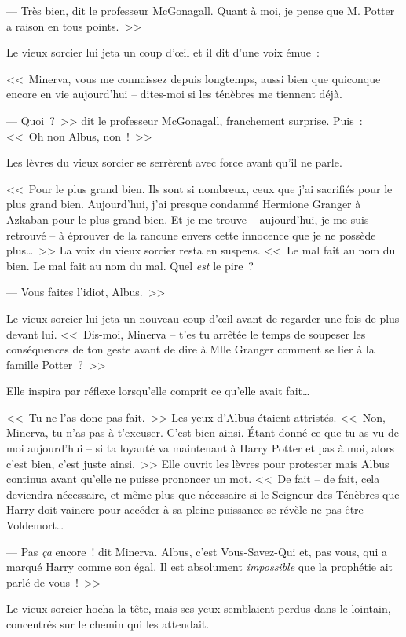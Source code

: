 --- Très bien, dit le professeur McGonagall. Quant à moi, je pense que M. Potter a raison en tous points.~>>

Le vieux sorcier lui jeta un coup d'œil et il dit d'une voix émue~:

<<~Minerva, vous me connaissez depuis longtemps, aussi bien que quiconque encore en vie aujourd'hui -- dites-moi si les ténèbres me tiennent déjà.

--- Quoi~?~>> dit le professeur McGonagall, franchement surprise. Puis~: <<~Oh non Albus, non~!~>>

Les lèvres du vieux sorcier se serrèrent avec force avant qu'il ne parle.

<<~Pour le plus grand bien. Ils sont si nombreux, ceux que j'ai sacrifiés pour le plus grand bien. Aujourd'hui, j'ai presque condamné Hermione Granger à Azkaban pour le plus grand bien. Et je me trouve -- aujourd'hui, je me suis retrouvé -- à éprouver de la rancune envers cette innocence que je ne possède plus…~>> La voix du vieux sorcier resta en suspens. <<~Le mal fait au nom du bien. Le mal fait au nom du mal. Quel \emph{est} le pire~?

--- Vous faites l'idiot, Albus.~>>

Le vieux sorcier lui jeta un nouveau coup d'œil avant de regarder une fois de plus devant lui. <<~Dis-moi, Minerva -- t'es tu arrêtée le temps de soupeser les conséquences de ton geste avant de dire à Mlle Granger comment se lier à la famille Potter~?~>>

Elle inspira par réflexe lorsqu'elle comprit ce qu'elle avait fait…

<<~Tu ne l'as donc pas fait.~>> Les yeux d'Albus étaient attristés. <<~Non, Minerva, tu n'as pas à t'excuser. C'est bien ainsi. Étant donné ce que tu as vu de moi aujourd'hui -- si ta loyauté va maintenant à Harry Potter et pas à moi, alors c'est bien, c'est juste ainsi.~>> Elle ouvrit les lèvres pour protester mais Albus continua avant qu'elle ne puisse prononcer un mot. <<~De fait -- de fait, cela deviendra nécessaire, et même plus que nécessaire si le Seigneur des Ténèbres que Harry doit vaincre pour accéder à sa pleine puissance se révèle ne pas être Voldemort…

--- Pas \emph{ça} encore~! dit Minerva. Albus, c'est Vous-Savez-Qui et, pas vous, qui a marqué Harry comme son égal. Il est absolument \emph{impossible} que la prophétie ait parlé de vous~!~>>

Le vieux sorcier hocha la tête, mais ses yeux semblaient perdus dans le lointain, concentrés sur le chemin qui les attendait.

